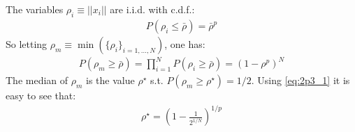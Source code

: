 

The variables $\rho_i \equiv ||x_i||$ are i.i.d. with c.d.f.: 
\begin{eqnarray}
P(\rho_i \leq \bar{\rho}) = \bar{\rho}^p
\end{eqnarray}
So letting $\rho_m \equiv \min(\{\rho_i\}_{i=1,\ldots,N})$, one has:
\begin{eqnarray}\label{eq:2p3_1}
P\left(\rho_m \geq \bar{\rho}\right) = \prod_{i=1}^{N}P\left(\rho_i \geq 
\bar{\rho}\right) = \left(1 - \rho^p \right)^N
\end{eqnarray}
The median of $\rho_m$ is the value $\rho^\star$ s.t. $P\left(\rho_m \geq 
\rho^\star\right) = 1/2$. Using \eqref{eq:2p3_1} it is easy to see that:
\begin{eqnarray}
\rho^\star = \left(1 - \frac{1}{2^{1/N}} \right) ^{1/p}
\end{eqnarray}